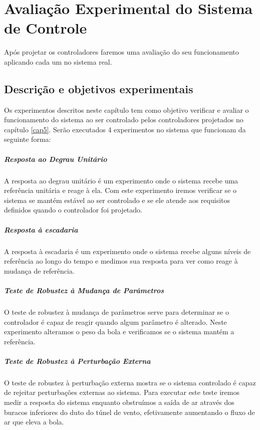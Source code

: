 \chapter{Avaliação Experimental do Sistema de Controle}\label{cap6}
Após projetar os controladores faremos uma avaliação do seu funcionamento aplicando cada um no sistema real.
\section{Descrição e objetivos experimentais}
Os experimentos descritos neste capítulo tem como objetivo verificar e avaliar o funcionamento do sistema ao ser controlado pelos controladores projetados no capítulo \ref{cap5}. Serão executados 4 experimentos no sistema que funcionam da seguinte forma:
\paragraph{Resposta ao Degrau Unitário} A resposta ao degrau unitário é um experimento onde o sistema recebe uma referência unitária e reage à ela. Com este experimento iremos verificar se o sistema se mantém estável ao ser controlado e se ele atende aos requisitos definidos quando o controlador foi projetado.
\paragraph{Resposta à escadaria} A resposta à escadaria é um experimento onde o sistema recebe alguns níveis de referência ao longo do tempo e medimos sua resposta para ver como reage à mudança de referência.

\paragraph{Teste de Robustez à Mudança de Parâmetros}

O teste de robustez à mudança de parâmetros serve para determinar se o controlador é capaz de reagir quando algum parâmetro é alterado. Neste experimento alteramos o peso da bola e verificamos se o sistema mantém a referência.

\paragraph{Teste de Robustez à Perturbação Externa}
  O teste de robustez à perturbação externa mostra se o sistema controlado é capaz de rejeitar perturbações externas ao sistema. Para executar este teste iremos medir a resposta do sistema enquanto obstruímos a saída de ar através dos buracos inferiores do duto do túnel de vento, efetivamente aumentando o fluxo de ar que eleva a bola.

